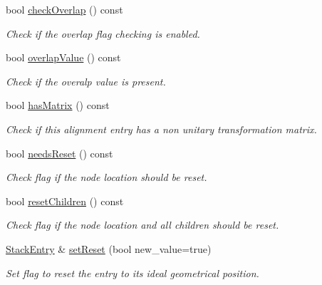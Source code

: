 \begin{DoxyCompactItemize}
bool \hyperlink{struct_d_d4hep_1_1_alignments_1_1_alignment_stack_1_1_stack_entry_a3444dae73770098e181f771a13ee389e}{check\+Overlap} () const
\begin{DoxyCompactList}\small\item\em Check if the overlap flag checking is enabled. \end{DoxyCompactList}\item 
bool \hyperlink{struct_d_d4hep_1_1_alignments_1_1_alignment_stack_1_1_stack_entry_a6e1b32b20c7cc470786a945e19a9fef3}{overlap\+Value} () const
\begin{DoxyCompactList}\small\item\em Check if the overalp value is present. \end{DoxyCompactList}\item 
bool \hyperlink{struct_d_d4hep_1_1_alignments_1_1_alignment_stack_1_1_stack_entry_a96f255d40cf16b0cfbf37496dafac7bd}{has\+Matrix} () const
\begin{DoxyCompactList}\small\item\em Check if this alignment entry has a non unitary transformation matrix. \end{DoxyCompactList}\item 
bool \hyperlink{struct_d_d4hep_1_1_alignments_1_1_alignment_stack_1_1_stack_entry_aa27630a03bbc801c95ab1b645a5030d4}{needs\+Reset} () const
\begin{DoxyCompactList}\small\item\em Check flag if the node location should be reset. \end{DoxyCompactList}\item 
bool \hyperlink{struct_d_d4hep_1_1_alignments_1_1_alignment_stack_1_1_stack_entry_acafcd9394e676b875de7b9bc9d58790f}{reset\+Children} () const
\begin{DoxyCompactList}\small\item\em Check flag if the node location and all children should be reset. \end{DoxyCompactList}\item 
\hyperlink{struct_d_d4hep_1_1_alignments_1_1_alignment_stack_1_1_stack_entry}{Stack\+Entry} \& \hyperlink{struct_d_d4hep_1_1_alignments_1_1_alignment_stack_1_1_stack_entry_acd99f7e6583a0c0b65dff2393eaa670c}{set\+Reset} (bool new\+\_\+value=true)
\begin{DoxyCompactList}\small\item\em Set flag to reset the entry to it\textquotesingle{}s ideal geometrical position. \end{DoxyCompactList}\item 

\end{DoxyCompactItemize}
